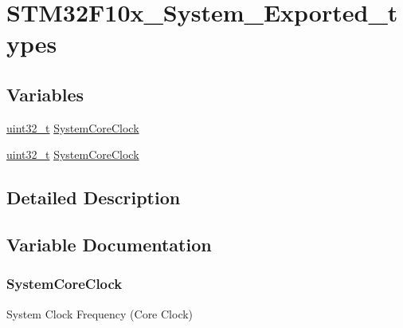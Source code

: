 \hypertarget{group___s_t_m32_f10x___system___exported__types}{}\section{S\+T\+M32\+F10x\+\_\+\+System\+\_\+\+Exported\+\_\+types}
\label{group___s_t_m32_f10x___system___exported__types}
\subsection*{Variables}
\begin{DoxyCompactItemize}
\item 
\hyperlink{_p_e___types_8h_a33594304e786b158f3fb30289278f5af}{uint32\+\_\+t} \hyperlink{group___s_t_m32_f10x___system___exported__types_gaa3cd3e43291e81e795d642b79b6088e6}{System\+Core\+Clock}
\item 
\hyperlink{_p_e___types_8h_a33594304e786b158f3fb30289278f5af}{uint32\+\_\+t} \hyperlink{group___s_t_m32_f10x___system___exported__types_gaa3cd3e43291e81e795d642b79b6088e6}{System\+Core\+Clock}
\end{DoxyCompactItemize}


\subsection{Detailed Description}


\subsection{Variable Documentation}
\subsubsection[{\texorpdfstring{System\+Core\+Clock}{SystemCoreClock}}]{ System\+Core\+Clock}\hypertarget{group___s_t_m32_f10x___system___exported__types_gaa3cd3e43291e81e795d642b79b6088e6}{}\label{group___s_t_m32_f10x___system___exported__types_gaa3cd3e43291e81e795d642b79b6088e6}
System Clock Frequency (Core Clock) 

